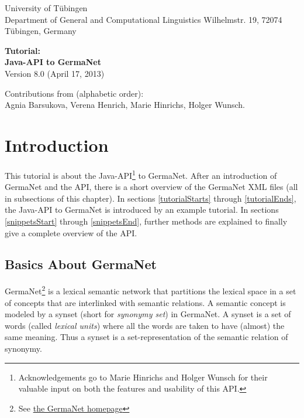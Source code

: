 \documentclass[12pt,a4paper,english,utf8]{report}
\begin{document}
\begin{titlepage}
\begin{flushleft}
{\large University of Tübingen\\
Department of General and Computational Linguistics
Wilhelmstr. 19, 72074 Tübingen, Germany}\\[4.5cm]
\end{flushleft}

\begin{center}
{\huge \bfseries Tutorial:\\[0.4cm]
Java-API to GermaNet}\\[1.0cm]
{\large Version 8.0 (April 17, 2013)}\\[10.0cm]
\end{center}

\begin{flushleft} \small
Contributions from (alphabetic order):\\
Agnia Barsukova, Verena Henrich, Marie Hinrichs, Holger Wunsch.
\end{flushleft}


\end{titlepage}

\tableofcontents
\newpage



\chapter{Introduction}
This tutorial is about the Java-API\footnote{Acknowledgements go to Marie Hinrichs and Holger Wunsch for their valuable input on both the features and usability of this API.} to GermaNet. After an introduction of GermaNet and the API, there is a short overview of the GermaNet XML files (all in subsections of this chapter). In sections \ref{tutorialStarts} through \ref{tutorialEnds}, the Java-API to GermaNet is introduced by an example tutorial. In sections \ref{snippetsStart} through \ref{snippetsEnd}, further methods are explained to finally give a complete overview of the API.



\section{Basics About GermaNet}
GermaNet\footnote{See \href{http://www.sfs.uni-tuebingen.de/GermaNet/}{the GermaNet homepage}} is a lexical semantic network that partitions the lexical space in a set of concepts that are interlinked with semantic relations. A semantic concept is modeled by a synset (short for \emph{synonymy set}) in GermaNet. A synset is a set of words (called \emph{lexical units}) where all the words are taken to have (almost) the same meaning. Thus a synset is a set-representation of the semantic relation of synonymy.
\end{document}
